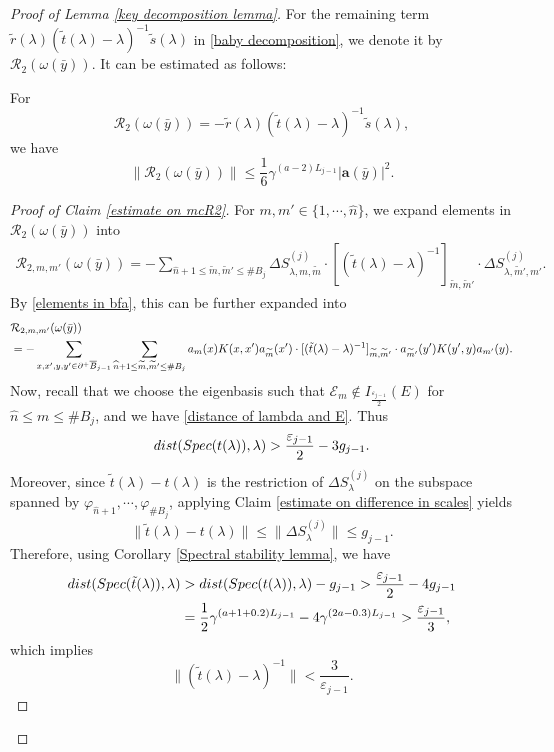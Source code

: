 \documentclass[10pt,a4paper]{amsart}
\newcommand{\barB}{\overline{B}}
\newcommand{\bfa}{\mathbf{a}}
\newcommand{\diffSj}{\Delta {S}^{(j)}}
\newcommand{\dist}{{\rm dist}}
\newcommand{\mcE}{\mathcal{E}}
\newcommand{\mcR}{\mathcal{R}}
\newcommand{\spec}{{\rm Spec}}
\newcommand{\tm}{\widetilde{m}}
\newcommand{\whn}{\widehat{n}}
\renewcommand{\tt}{\tilde{t}}
\begin{document}
\begin{proof}[Proof of Lemma \ref{key decomposition lemma}]
For the remaining term $\tilde{r}(\lambda)(\tilde{t}(\lambda)-\lambda)^{-1}\tilde{s}(\lambda)$ in \eqref{baby decomposition}, we denote it by $\mcR_2(\omega(\bar{y}))$. It can be estimated  as follows:
\begin{claim}\label{estimate on mcR2}
  For 
  \begin{equation}\label{mcR2}
    \mcR_2(\omega(\bar{y}))=-\tilde{r}(\lambda)(\tilde{t}(\lambda)-\lambda)^{-1}\tilde{s}(\lambda),
  \end{equation}
  we have 
  \[ \|\mcR_2(\omega(\bar{y})) \|\leq \frac{1}{6}\gamma^{(a-2)L_{j-1}} |\bfa(\bar{y})|^2 .\] 
\end{claim}
\begin{proof}[Proof of Claim \ref{estimate on mcR2}]
  For $m,m'\in \{1,\cdots,\whn\}$, we expand elements in $\mcR_2(\omega(\bar{y}))$ into 
  \begin{align*}
    \mcR_{2,m,m'}(\omega(\bar{y}))=-\sum_{ \whn+1\leq \tm,\tm'\leq  \# B_j } \diffSj_{\lambda,m,\tm}\cdot [(\tt(\lambda)-\lambda)^{-1}]_{\tm,\tm'}\cdot \diffSj_{\lambda,\tm',m'}.
  \end{align*}
  By \eqref{elements in bfa}, this can be further expanded into 
  \begin{align}\label{mcR2 expansion}
        &\mcR_{2,m,m'}(\omega(\bar{y}))\\
     \notag   &=-\sum_{x,x',y,y'\in \partial^+\barB_{j-1}} \sum_{ \whn+1\leq \tm,\tm'\leq  \# B_j } a_{m}(x)K(x,x') a_{\tm}(x')\cdot [(\tt(\lambda)-\lambda)^{-1}]_{\tm,\tm'}\cdot a_{\tm'}(y')K(y',y) a_{m'}(y).
  \end{align}
  Now, recall that we choose the eigenbasis such that $\mcE_m\notin I_{\frac{\varepsilon_{j-1}}{2}}(E)$ for $\whn\leq m\leq \# B_j$, and we have \eqref{distance of lambda and E}. Thus 
  \[\dist(\spec(t(\lambda)),\lambda)> \frac{\varepsilon_{j-1}}{2}-3g_{j-1}.\]
  Moreover, since $\tt(\lambda)-t(\lambda)$ is the restriction of $\diffSj_{\lambda}$ on the subspace spanned by ${\varphi_{\whn+1},\cdots,\varphi_{\#B_j}}$, applying Claim \ref{estimate on difference in scales} yields 
  \[\| \tt(\lambda)-t(\lambda) \| \leq \|\diffSj_{\lambda}\|\leq g_{j-1}.\]
  Therefore, using  Corollary \ref{Spectral stability lemma},  we have 
  \begin{align*}
      \dist(\spec(\tt(\lambda)),\lambda) & >\dist(\spec(t(\lambda)),\lambda)-g_{j-1}>\frac{\varepsilon_{j-1}}{2}-4g_{j-1} \\
        &=\frac{1}{2}\gamma^{(a+1+0.2)L_{j-1}}-4\gamma^{(2a-0.3)L_{j-1}} >\frac{\varepsilon_{j-1}}{3},
  \end{align*}
  which implies 
  \begin{equation}\label{resolvent of tilde t}
    \|(\tt(\lambda)-\lambda)^{-1}\|< \frac{3}{\varepsilon_{j-1}}.
  \end{equation}


\end{proof}
\end{proof}
\end{document}

